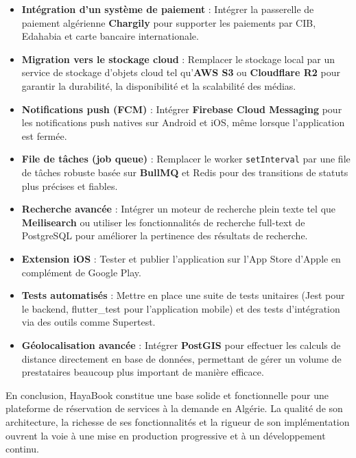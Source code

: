 \begin{itemize}
    \item \textbf{Intégration d'un système de paiement} : Intégrer la passerelle de paiement algérienne \textbf{Chargily} pour supporter les paiements par CIB, Edahabia et carte bancaire internationale.
    \item \textbf{Migration vers le stockage cloud} : Remplacer le stockage local par un service de stockage d'objets cloud tel qu'\textbf{AWS S3} ou \textbf{Cloudflare R2} pour garantir la durabilité, la disponibilité et la scalabilité des médias.
    \item \textbf{Notifications push (FCM)} : Intégrer \textbf{Firebase Cloud Messaging} pour les notifications push natives sur Android et iOS, même lorsque l'application est fermée.
    \item \textbf{File de tâches (job queue)} : Remplacer le worker \texttt{setInterval} par une file de tâches robuste basée sur \textbf{BullMQ} et Redis pour des transitions de statuts plus précises et fiables.
    \item \textbf{Recherche avancée} : Intégrer un moteur de recherche plein texte tel que \textbf{Meilisearch} ou utiliser les fonctionnalités de recherche full-text de PostgreSQL pour améliorer la pertinence des résultats de recherche.
    \item \textbf{Extension iOS} : Tester et publier l'application sur l'App Store d'Apple en complément de Google Play.
    \item \textbf{Tests automatisés} : Mettre en place une suite de tests unitaires (Jest pour le backend, flutter\_test pour l'application mobile) et des tests d'intégration via des outils comme Supertest.
    \item \textbf{Géolocalisation avancée} : Intégrer \textbf{PostGIS} pour effectuer les calculs de distance directement en base de données, permettant de gérer un volume de prestataires beaucoup plus important de manière efficace.
\end{itemize}

En conclusion, HayaBook constitue une base solide et fonctionnelle pour une plateforme de réservation de services à la demande en Algérie. La qualité de son architecture, la richesse de ses fonctionnalités et la rigueur de son implémentation ouvrent la voie à une mise en production progressive et à un développement continu.